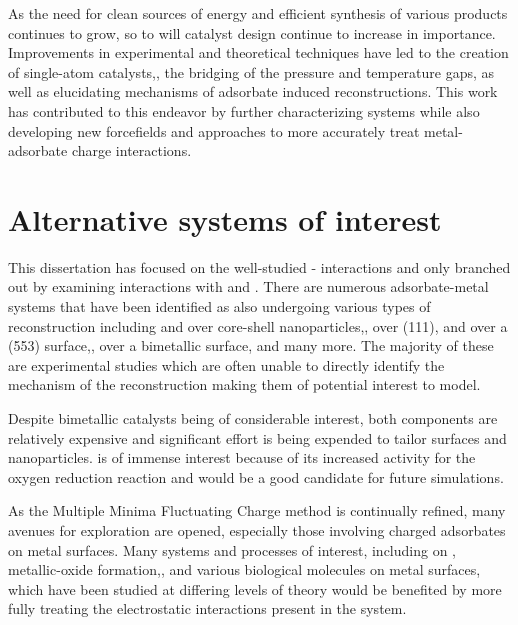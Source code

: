 As the need for clean sources of energy and efficient synthesis of various
products continues to grow, so to will catalyst design continue to increase in
importance.  Improvements in experimental and theoretical techniques have led
to the creation of single-atom catalysts,\citep{Qiao:2011zp, Yang:2013sf}, the
bridging of the pressure and temperature gaps,\citep{Tao:2010aa, Eren:2016qt}
as well as elucidating mechanisms of adsorbate induced
reconstructions.\citep{Michalka:2013aa,Kim:2016cr} This work has contributed to
this endeavor by further characterizing  systems while also
developing new forcefields and approaches to more accurately treat
metal-adsorbate charge interactions.



\section{Alternative systems of interest}
This dissertation has focused on the well-studied - interactions
and only branched out by examining  interactions with  and
.  There are numerous adsorbate-metal systems that have been identified
as also undergoing various types of reconstruction including  and
 over  core-shell nanoparticles,\citep{Tao:2008aa},
 over  (111),\citep{Eren:2016qt}  and  over a (553)
 surface,\citep{Zhang:2015zr},  over a  bimetallic
surface,\citep{Kim:2013mi} and many more. The majority of these are experimental
studies which are often unable to directly identify the mechanism of the
reconstruction making them of potential interest to model.

Despite  bimetallic catalysts being of considerable interest,
both components are relatively expensive and significant effort is being
expended to tailor  surfaces and nanoparticles.
 is of immense interest because of its increased activity for
the oxygen reduction reaction and would be a good candidate for future
simulations.\citep{Tuaev:2013fk, Stamenkovic:2007kk,Sneed:2014fj}

As the Multiple Minima Fluctuating Charge method is continually refined, many
avenues for exploration are opened, especially those involving charged
adsorbates on metal surfaces. Many systems and processes of interest, including
 on ,\citep{Xu:2016dz} metallic-oxide
formation,\citep{Streitz:1994mw, Fantauzzi:2014pb, Lloyd:2016jt}, and various
biological molecules on metal surfaces,\citep{Padmos:0qf, Mete:2015rc} which
have been studied at differing levels of theory would be benefited by more
fully treating the electrostatic interactions present in the system. 
